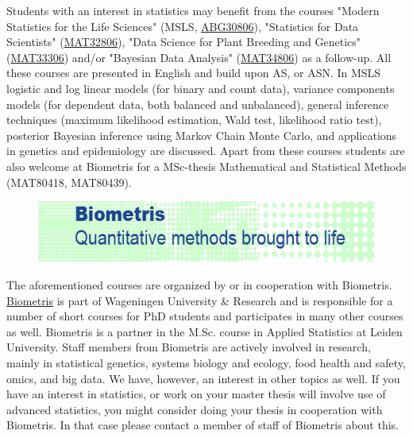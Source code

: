 Students with an interest in statistics may benefit from the courses "Modern Statistics for the Life Sciences" (MSLS, \href{https://wur.osiris-student.nl/#/onderwijscatalogus/extern/cursus?cursuscode=ABG30806&collegejaar=huidig}{ABG30806}), "Statistics for Data Scientists" (\href{https://wur.osiris-student.nl/#/onderwijscatalogus/extern/cursus?cursuscode=MAT32806&collegejaar=huidig}{MAT32806}), "Data Science for Plant Breeding and Genetics" (\href{https://wur.osiris-student.nl/#/onderwijscatalogus/extern/cursus?cursuscode=MAT33306&collegejaar=huidig}{MAT33306}) and/or "Bayesian Data Analysis" (\href{https://wur.osiris-student.nl/#/onderwijscatalogus/extern/cursus?cursuscode=MAT34806&collegejaar=huidig}{MAT34806}) as a follow-up. All these courses are presented in English and build upon AS, or ASN. In MSLS logistic and log linear models (for binary and count data), variance components models (for dependent data, both balanced and unbalanced), general inference techniques (maximum likelihood estimation, Wald test, likelihood ratio test), posterior Bayesian inference using Markov Chain Monte Carlo, and applications in genetics and epidemiology are discussed. Apart from these courses students are also welcome at Biometris for a MSc-thesis Mathematical and Statistical Methods (MAT80418, MAT80439).

\begin{figure}[!h]%
  \begin{center}%
    \includegraphics[width=11.6cm]{biometris.png}%
    \label{fig:biometris}%
  \end{center}%
\end{figure}%

The aforementioned courses are organized by or in cooperation with Biometris. \href{https://www.wur.eu/biometris}{Biometris} is part of Wageningen University \& Research and is responsible for a number of short courses for PhD students and participates in many other courses as well. Biometris is a partner in the M.Sc. course in Applied Statistics at Leiden University. Staff members from Biometris are actively involved in research, mainly in statistical genetics, systems biology and ecology, food health and safety, omics, and big data. We have, however, an interest in other topics as well. If you have an interest in statistics, or work on your master thesis will involve use of advanced statistics, you might consider doing your thesis in cooperation with Biometris. In that case please contact a member of staff of Biometris about this.


\newpage
